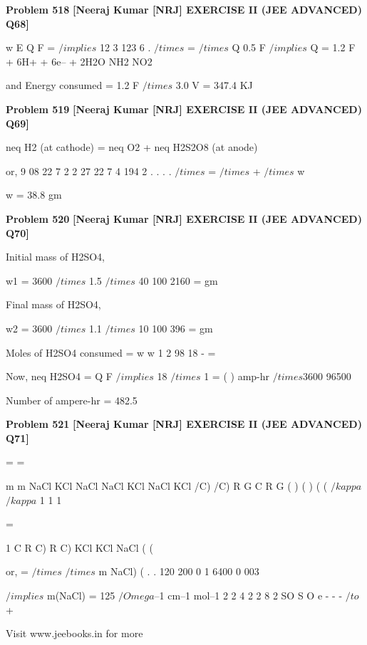 \begin{problembox}
\textbf{Problem 518} \hfill \textbf{[Neeraj Kumar [NRJ] EXERCISE II (JEE ADVANCED) Q68]}
\label{q:ext-nrj_all_questions-518}

w
E
Q
F
=
 $/implies$ 12 3
123
6
. $/times$
=
$/times$
Q
0.5
F
 $/implies$ Q = 1.2 F
+ 6H+ + 6e--
+ 2H2O
NH2
NO2
 
 and Energy consumed = 1.2 F $/times$ 3.0 V = 347.4 KJ
\end{problembox}

\begin{problembox}
\textbf{Problem 519} \hfill \textbf{[Neeraj Kumar [NRJ] EXERCISE II (JEE ADVANCED) Q69]}
\label{q:ext-nrj_all_questions-519}

neq H2 (at cathode) = neq O2 + neq H2S2O8 
(at anode)
 
 or, 9 08
22 7
2
2 27
22 7
4
194
2
.
.
.
.
$/times$
=
$/times$
+
$/times$
w
 
 
   w = 38.8 gm
\end{problembox}

\begin{problembox}
\textbf{Problem 520} \hfill \textbf{[Neeraj Kumar [NRJ] EXERCISE II (JEE ADVANCED) Q70]}
\label{q:ext-nrj_all_questions-520}

Initial mass of H2SO4, 
 
 w1 = 3600 $/times$ 1.5 $/times$ 40
100
2160
=
gm
 
 Final mass of H2SO4, 
 
 w2 = 3600 $/times$ 1.1 $/times$ 10
100
396
=
gm
 
   Moles of H2SO4 consumed = w
w
1
2
98
18
-
=
 
 Now, neq H2SO4 = Q
F $/implies$ 18 $/times$ 1 = (
)
amp-hr $/times$3600
96500
 
   Number of ampere-hr = 482.5
\end{problembox}

\begin{problembox}
\textbf{Problem 521} \hfill \textbf{[Neeraj Kumar [NRJ] EXERCISE II (JEE ADVANCED) Q71]}
\label{q:ext-nrj_all_questions-521}

 
 
=
=
 
 
 
 
 
m
m
NaCl
KCl
NaCl
NaCl
KCl
NaCl
KCl
/C)
/C)
R
G
C
R
G
(
)
(
)
(
(
$/kappa$
$/kappa$
1
1
1
 
=
 
 
1
C
R C)
R C)
KCl
KCl
NaCl
(
(
 
 or,  
=
$/times$
$/times$
m NaCl)
(
.
.
120
200
0 1
6400
0 003 
 
 $/implies$  m(NaCl) = 125 $/Omega$--1 cm--1 mol--1
2
2
4
2
2
8
2
SO
S O
e
-
-
-
$/to$
+
  
  
 
 
Visit www.jeebooks.in for more
\end{problembox}

